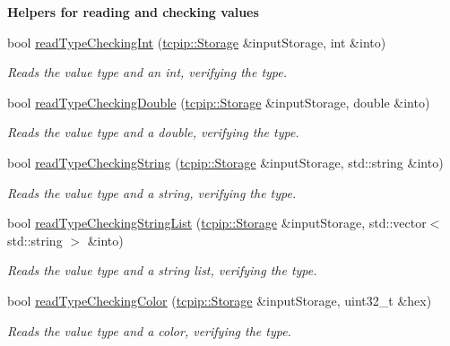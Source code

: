 \begin{Indent}\textbf{ Helpers for reading and checking values}\par
\begin{DoxyCompactItemize}
\item 
bool \hyperlink{namespacetraci__api_a57c1a8583619eb1e9984249249435f8e}{read\+Type\+Checking\+Int} (\hyperlink{classtcpip_1_1_storage}{tcpip\+::\+Storage} \&input\+Storage, int \&into)
\begin{DoxyCompactList}\small\item\em Reads the value type and an int, verifying the type. \end{DoxyCompactList}\item 
bool \hyperlink{namespacetraci__api_a5229be0b43fc9f5d9f413d5e51924b50}{read\+Type\+Checking\+Double} (\hyperlink{classtcpip_1_1_storage}{tcpip\+::\+Storage} \&input\+Storage, double \&into)
\begin{DoxyCompactList}\small\item\em Reads the value type and a double, verifying the type. \end{DoxyCompactList}\item 
bool \hyperlink{namespacetraci__api_ac51a66efdbed4dcdcef596643fe387ec}{read\+Type\+Checking\+String} (\hyperlink{classtcpip_1_1_storage}{tcpip\+::\+Storage} \&input\+Storage, std\+::string \&into)
\begin{DoxyCompactList}\small\item\em Reads the value type and a string, verifying the type. \end{DoxyCompactList}\item 
bool \hyperlink{namespacetraci__api_aa16305c07ac5f8221d9099f2e3a7531c}{read\+Type\+Checking\+String\+List} (\hyperlink{classtcpip_1_1_storage}{tcpip\+::\+Storage} \&input\+Storage, std\+::vector$<$ std\+::string $>$ \&into)
\begin{DoxyCompactList}\small\item\em Reads the value type and a string list, verifying the type. \end{DoxyCompactList}\item 
bool \hyperlink{namespacetraci__api_af8c7656fbd212acb13f037d4fb20f1f7}{read\+Type\+Checking\+Color} (\hyperlink{classtcpip_1_1_storage}{tcpip\+::\+Storage} \&input\+Storage, uint32\+\_\+t \&hex)
\begin{DoxyCompactList}\small\item\em Reads the value type and a color, verifying the type. \end{DoxyCompactList}\item 

\end{DoxyCompactItemize}
\end{Indent}
